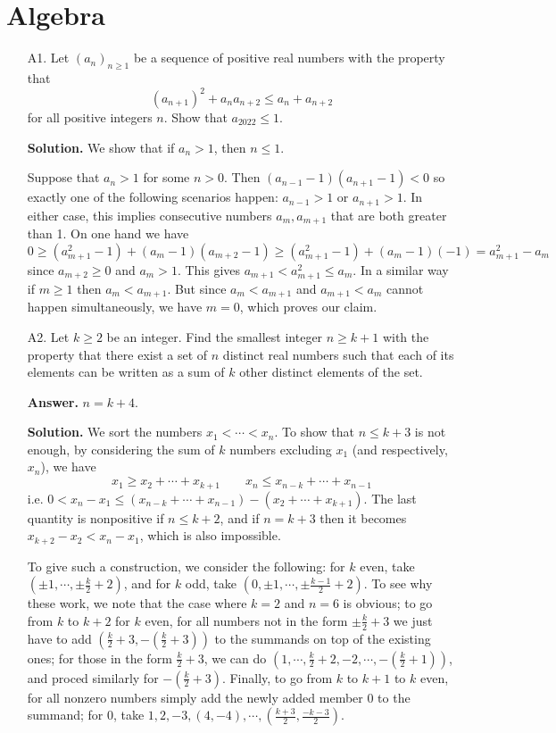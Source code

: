 \documentclass[11pt,a4paper]{article}
\begin{document}
	\section*{Algebra}
	\begin{enumerate}
		\item [A1.] 
		Let $(a_n)_{n\ge 1}$ be a sequence of positive real numbers with the property that 
		\[(a_{n+1})^2 + a_na_{n+2} \le a_n + a_{n+2}\]
		for all positive integers $n$. Show that $a_{2022}\le 1$.
		
		\textbf{Solution.} 
		We show that if $a_n > 1$, then $n \le 1$. 
		
		Suppose that $a_n > 1$ for some $n > 0$. 
		Then $(a_{n-1} - 1)(a_{n + 1} - 1) < 0$ so exactly one of the following scenarios happen: 
		$a_{n - 1} > 1$ or $a_{n + 1} > 1$. In either case, this implies consecutive numbers $a_m, a_{m + 1}$ that are both greater than 1. 
		On one hand we have 
		\[
		0 \ge (a_{m + 1}^2 - 1) + (a_m - 1)(a_{m + 2} - 1) \ge   (a_{m + 1}^2 - 1) + (a_m - 1)(-1) = a_{m + 1}^2 - a_m
		\]
		since $a_{m + 2}\ge 0$ and $a_m > 1$. This gives $a_{m + 1} < a_{m + 1}^2 \le a_m$. 
		In a similar way if $m \ge 1$ then $a_m < a_{m + 1}$. 
		But since $a_{m} < a_{m + 1}$ and $a_{m + 1} < a_m$ cannot happen simultaneously, 
		we have $m=0$, which proves our claim. 
		
		\item[A2.]
		Let $k \ge 2$ be an integer. 
		Find the smallest integer $n \ge k + 1$ with the property that there exist a set of $n$ distinct real numbers such that each of its elements can be written as a sum of $k$ other distinct elements of the set.
		
		\textbf{Answer.} $n = k + 4$. 
		
		\textbf{Solution.} 
		We sort the numbers $x_1 < \cdots < x_n$. 
		To show that $n\le k + 3$ is not enough, by considering the sum of $k$ numbers excluding $x_1$ (and respectively, $x_n$), 
		we have 
		\[
		x_1 \ge x_2 + \cdots + x_{k + 1}
		\qquad 
		x_n \le x_{n - k} + \cdots + x_{n - 1}
		\]
		i.e. $0 < x_n - x_1 \le (x_{n - k} + \cdots + x_{n - 1}) - (x_2 + \cdots + x_{k + 1})$. 
		The last quantity is nonpositive if $n\le k + 2$, 
		and if $n = k + 3$ then it becomes $x_{k + 2} - x_2 < x_n - x_1$, which is also impossible. 
		
		To give such a construction, we consider the following: 
		for $k$ even, take $(\pm 1, \cdots, \pm \frac{k}{2} + 2)$, 
		and for $k$ odd, take $(0, \pm 1, \cdots, \pm \frac{k - 1}{2} + 2)$. 
		To see why these work, we note that the case where $k=2$ and $n=6$ is obvious; 
		to go from $k$ to $k+2$ for $k$ even, 
		for all numbers not in the form $\pm \frac{k}{2} + 3$ we just have to add $( \frac{k}{2} + 3, -( \frac{k}{2} + 3))$ to the summands on top of the existing ones; 
		for those in the form $\frac{k}{2} + 3$, we can do 
		$(1, \cdots, \frac{k}{2} + 2, -2, \cdots, -(\frac{k}{2} + 1))$, 
		and proced similarly for $-(\frac{k}{2} + 3)$. 
		Finally, to go from $k$ to $k+1$ to $k$ even, 
		for all nonzero numbers simply add the newly added member 0 to the summand; 
		for 0, take $1, 2, -3, (4, -4), \cdots, (\frac{k+3}{2}, \frac{-k-3}{2})$. 
		

\end{enumerate}
\end{document}
